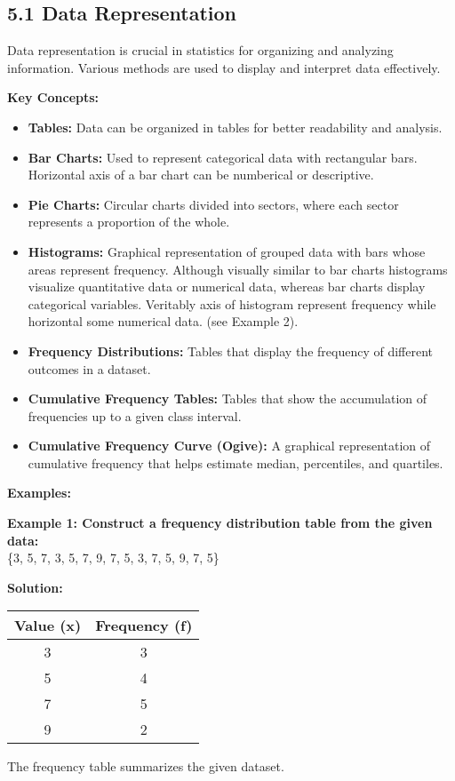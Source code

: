 
\subsection*{5.1 Data Representation}
Data representation is crucial in statistics for organizing and analyzing information. Various methods are used to display and interpret data effectively.

\textbf{Key Concepts:}

\begin{itemize}
	\item \textbf{Tables:} Data can be organized in tables for better readability and analysis.
	\item \textbf{Bar Charts:} Used to represent categorical data with rectangular bars. Horizontal axis of a bar chart can be numberical or descriptive.
	\item \textbf{Pie Charts:} Circular charts divided into sectors, where each sector represents a proportion of the whole.
	\item \textbf{Histograms:} Graphical representation of grouped data with bars whose areas represent frequency. Although visually similar to bar charts histograms visualize quantitative data or numerical data, whereas bar charts display categorical variables. Veritably axis of histogram represent frequency while horizontal some numerical data. (see Example 2).
	\item \textbf{Frequency Distributions:} Tables that display the frequency of different outcomes in a dataset.
	\item \textbf{Cumulative Frequency Tables:} Tables that show the accumulation of frequencies up to a given class interval.
	\item \textbf{Cumulative Frequency Curve (Ogive):} A graphical representation of cumulative frequency that helps estimate median, percentiles, and quartiles.
	
\end{itemize}

\textbf{Examples:}

\begin{flushleft}
	\textbf{Example 1: Construct a frequency distribution table from the given data:} \\
	\{3, 5, 7, 3, 5, 7, 9, 7, 5, 3, 7, 5, 9, 7, 5\}
	
	\vspace{0.5cm}
	\textbf{Solution:}
	\vspace{0.5cm}
	
	\begin{center}
		\begin{tabular}{c|c}
			\textbf{Value (x)} & \textbf{Frequency (f)} \\
			\hline
			3 & 3 \\
			5 & 4 \\
			7 & 5 \\
			9 & 2 \\
		\end{tabular}
	\end{center}
	
	The frequency table summarizes the given dataset.
\end{flushleft}

